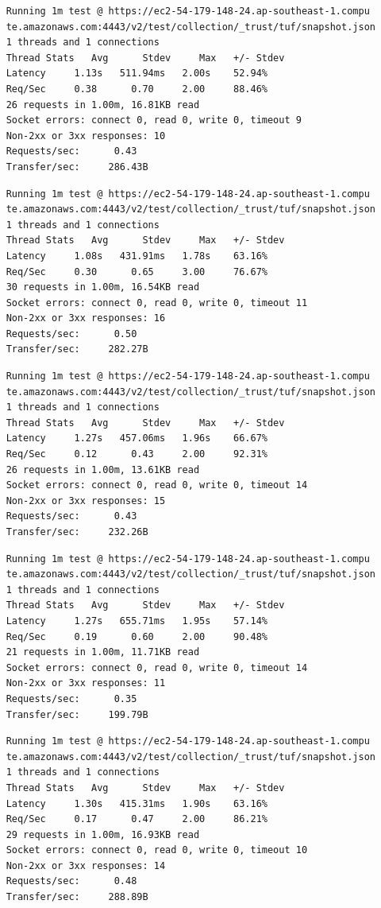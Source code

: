 \documentclass[a4paper,12pt]{article}
\newcounter{subsubsubsection}[subsubsection]
\begin{document}
{{	
	\begin{verbatim}
	Running 1m test @ https://ec2-54-179-148-24.ap-southeast-1.compu
	te.amazonaws.com:4443/v2/test/collection/_trust/tuf/snapshot.json
	1 threads and 1 connections
	Thread Stats   Avg      Stdev     Max   +/- Stdev
	Latency     1.13s   511.94ms   2.00s    52.94%
	Req/Sec     0.38      0.70     2.00     88.46%
	26 requests in 1.00m, 16.81KB read
	Socket errors: connect 0, read 0, write 0, timeout 9
	Non-2xx or 3xx responses: 10
	Requests/sec:      0.43
	Transfer/sec:     286.43B
	\end{verbatim}
	\begin{verbatim}
	Running 1m test @ https://ec2-54-179-148-24.ap-southeast-1.compu
	te.amazonaws.com:4443/v2/test/collection/_trust/tuf/snapshot.json
	1 threads and 1 connections
	Thread Stats   Avg      Stdev     Max   +/- Stdev
	Latency     1.08s   431.91ms   1.78s    63.16%
	Req/Sec     0.30      0.65     3.00     76.67%
	30 requests in 1.00m, 16.54KB read
	Socket errors: connect 0, read 0, write 0, timeout 11
	Non-2xx or 3xx responses: 16
	Requests/sec:      0.50
	Transfer/sec:     282.27B
	\end{verbatim}
	\begin{verbatim}
	Running 1m test @ https://ec2-54-179-148-24.ap-southeast-1.compu
	te.amazonaws.com:4443/v2/test/collection/_trust/tuf/snapshot.json
	1 threads and 1 connections
	Thread Stats   Avg      Stdev     Max   +/- Stdev
	Latency     1.27s   457.06ms   1.96s    66.67%
	Req/Sec     0.12      0.43     2.00     92.31%
	26 requests in 1.00m, 13.61KB read
	Socket errors: connect 0, read 0, write 0, timeout 14
	Non-2xx or 3xx responses: 15
	Requests/sec:      0.43
	Transfer/sec:     232.26B
	\end{verbatim}
	\newpage
	\begin{verbatim}
	Running 1m test @ https://ec2-54-179-148-24.ap-southeast-1.compu
	te.amazonaws.com:4443/v2/test/collection/_trust/tuf/snapshot.json
	1 threads and 1 connections
	Thread Stats   Avg      Stdev     Max   +/- Stdev
	Latency     1.27s   655.71ms   1.95s    57.14%
	Req/Sec     0.19      0.60     2.00     90.48%
	21 requests in 1.00m, 11.71KB read
	Socket errors: connect 0, read 0, write 0, timeout 14
	Non-2xx or 3xx responses: 11
	Requests/sec:      0.35
	Transfer/sec:     199.79B
	\end{verbatim}
	\begin{verbatim}
	Running 1m test @ https://ec2-54-179-148-24.ap-southeast-1.compu
	te.amazonaws.com:4443/v2/test/collection/_trust/tuf/snapshot.json
	1 threads and 1 connections
	Thread Stats   Avg      Stdev     Max   +/- Stdev
	Latency     1.30s   415.31ms   1.90s    63.16%
	Req/Sec     0.17      0.47     2.00     86.21%
	29 requests in 1.00m, 16.93KB read
	Socket errors: connect 0, read 0, write 0, timeout 10
	Non-2xx or 3xx responses: 14
	Requests/sec:      0.48
	Transfer/sec:     288.89B
	\end{verbatim}
	\newpage
	
}}
\end{document}

